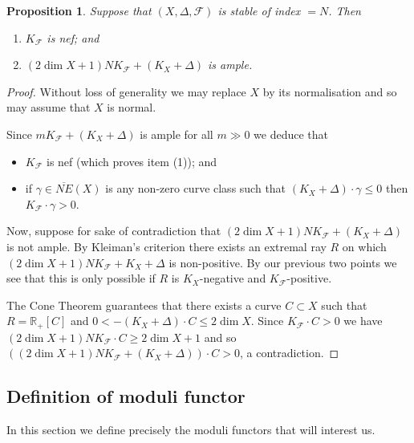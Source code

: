 \documentclass[12pt, a4paper]{amsart}
\newcounter{Theorem}
\newtheorem{proposition}[theorem]{Proposition}
\theoremstyle{definition}
\theoremstyle{named}
\begin{document}
\begin{proposition}
\label{prop_threshold}
    Suppose that $(X, \Delta, \mathcal F)$ is stable of index $=N$.  Then 
    \begin{enumerate}
        \item $K_{\mathcal F}$ is nef; and 
        \item    $(2\dim X+1)NK_{\mathcal F}+(K_X+\Delta)$ is ample.
    \end{enumerate}
\end{proposition}
\begin{proof}
    Without loss of generality we may replace $X$ by its normalisation and so may assume that $X$ is normal.

Since $mK_{\mathcal F}+(K_X+\Delta)$
is ample for all $m \gg 0$ we deduce that 
\begin{itemize}
    \item $K_{\mathcal F}$ is nef (which proves item (1)); and
    \item if $\gamma \in \overline{NE}(X)$ is any non-zero curve class such that $(K_X+\Delta)\cdot \gamma\le 0$
    then $K_{\mathcal F}\cdot \gamma >0$.
\end{itemize}




   Now, suppose for sake of contradiction that $(2\dim X+1)N K_{\mathcal F}+(K_{X}+\Delta)$ is not ample.
   By Kleiman's criterion there exists an extremal ray $R$
   on which $(2\dim X+1)N K_{\mathcal F}+K_{X}+\Delta$
   is non-positive.  By our previous two points we see that this is only possible if $R$ is  $K_{X}$-negative and $K_{\mathcal F}$-positive.
   
   The Cone Theorem 
\cite[Theorem 5.6]{MR4298910} guarantees that there exists a curve $C \subset X$ such that 
   $R = \mathbb R_+[C]$ and $0<-(K_{X}+\Delta)\cdot C \leq 2\dim X$.  Since $K_{\mathcal F}\cdot C>0$ we have $(2\dim X+1)N K_{\mathcal F}\cdot C \geq 2\dim X+1$ and so $((2\dim X+1)N K_{\mathcal F}+(K_{X}+\Delta))\cdot C > 0$, a contradiction. 
\end{proof}





\subsection{Definition of moduli functor}
\label{s_precise_definition}
In this section we define precisely the moduli functors that will interest us.
\end{document}

